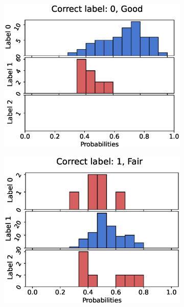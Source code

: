 
\begin{figure}
  \centering
  \begin{subfigure}[t]{0.33\textwidth}
    \includegraphics[width=\textwidth]{files/figs/res/femval/pc0-rb.eps}
    \caption{}
    \label{fig:femval-pc0}
  \end{subfigure}%
  \begin{subfigure}[t]{0.33\textwidth}
    \includegraphics[width=\textwidth]{files/figs/res/femval/pc1-rb.eps}
    \caption{}
    \label{fig:femval-pc1}

\end{subfigure}
\end{figure}
